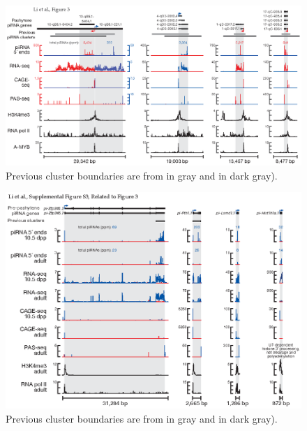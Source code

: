     
    \begin{landscape}
    \begin{figure}[htbp] %
      \centering 
      \includegraphics{Figures/MolCel/MolCel2013_Fig3.eps}
      \caption[Examples of Pachytene piRNA Genes]
      {
	      Previous cluster boundaries are from \citet{Lau2006} in gray and \citet{Girard2006} in  dark gray).
      	}
     	\label{fig:MolCelF3}
   		\end{figure}
    \begin{figure}[htbp] %
      \centering 
      \includegraphics{Figures/MolCel/MolCel2013_FigS3.eps}
      \caption[Examples of Pre-Pachytene piRNA Genes]
      {
      	Previous cluster boundaries are from \citet{Lau2006} in gray and \citet{Girard2006} in  dark gray).
      	}
      \label{fig:MolCelS3}
    	\end{figure}
    \end{landscape}

